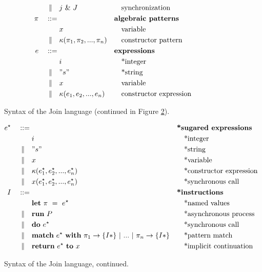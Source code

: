 \begin{figure}
\begin{align*}
\mid\kern-1pt\mid\quad& j ~\&~ J
                           && \quad\textrm{synchronization} \\
\pi\quad ::={}&            && \textbf{algebraic patterns} \\
         & x               && \quad\textrm{variable} \\
\mid\kern-1pt\mid\quad& \kappa(\pi_1, \pi_2, ..., \pi_n)
                           && \quad\textrm{constructor pattern} \\
e\quad ::={}&              && \textbf{expressions} \\
         & i               && \quad\textrm{*integer} \\
\mid\kern-1pt\mid\quad& " s "         && \quad\textrm{*string} \\
\mid\kern-1pt\mid\quad& x               && \quad\textrm{variable} \\
\mid\kern-1pt\mid\quad& \kappa(e_1, e_2, ..., e_n)
                           && \quad\textrm{constructor expression} \\
\end{align*}
\caption{Syntax of the Join language (continued in Figure
\ref{fig:syntax2}).\label{fig:syntax}}
\end{figure}

\begin{figure}
\begin{align*}
e^\star\quad ::={}&         && \textbf{*sugared expressions} \\
         & i               && \quad\textrm{*integer} \\
\mid\kern-1pt\mid\quad& " s "         && \quad\textrm{*string} \\
\mid\kern-1pt\mid\quad& x               && \quad\textrm{*variable} \\
\mid\kern-1pt\mid\quad& \kappa(e^\star_1, e^\star_2, ..., e^\star_n)
                           && \quad\textrm{*constructor expression} \\
\mid\kern-1pt\mid\quad& x(e^\star_1, e^\star_2, ..., e^\star_ n)
                           && \quad\textrm{*synchronous call} \\
I\quad ::={}&              && \textbf{*instructions} \\
         & \mathbf{let}~\pi~=~e^\star
                           && \quad\textrm{*named values} \\
\mid\kern-1pt\mid\quad& \mathbf{run}~P  && \quad\textrm{*asynchronous process} \\
\mid\kern-1pt\mid\quad& \mathbf{do}~e^\star && \quad\textrm{*synchronous call} \\
\mid\kern-1pt\mid\quad& \textbf{match}~e^\star~\textbf{with}~\pi_1
               \rightarrow \{ I* \} ~|~ ... ~|~ \pi_n \rightarrow \{ I* \}
                           && \quad\textrm{*pattern match} \\
\mid\kern-1pt\mid\quad& \textbf{return}~e^\star~\textbf{to}~x
                           && \quad\textrm{*implicit continuation}
\end{align*}
\caption{Syntax of the Join language, continued.\label{fig:syntax2}}
\end{figure}



